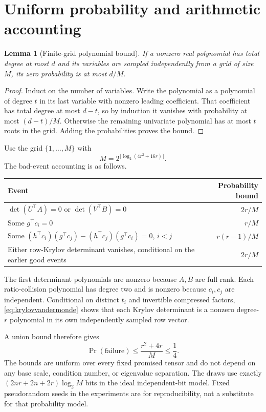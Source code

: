 \documentclass[11pt]{article}
\newtheorem{lemma}[theorem]{Lemma}
\theoremstyle{remark}\newtheorem{remark}[theorem]{Remark}
\begin{document}
\section{Uniform probability and arithmetic accounting}\label{sec:probability}
\begin{lemma}[Finite-grid polynomial bound]\label{lem:grid}
If a nonzero real polynomial has total degree at most $d$ and its variables are sampled independently from a grid of size $M$, its zero probability is at most $d/M$.
\end{lemma}
\begin{proof}
Induct on the number of variables. Write the polynomial as a polynomial of degree $t$ in its last variable with nonzero leading coefficient. That coefficient has total degree at most $d-t$, so by induction it vanishes with probability at most $(d-t)/M$. Otherwise the remaining univariate polynomial has at most $t$ roots in the grid. Adding the probabilities proves the bound.
\end{proof}

Use the grid $\{1,\ldots,M\}$ with
\begin{equation}\label{eq:gridsize}
 M=2^{\lceil\log_2(4r^2+16r)\rceil}.
\end{equation}
The bad-event accounting is as follows.
\begin{center}
\begin{tabular}{p{.65\linewidth}r}
\toprule
Event & Probability bound\\\midrule
$\det(U^\top A)=0$ or $\det(V^\top B)=0$ & $2r/M$\\
Some $g^\top c_i=0$ & $r/M$\\
Some $(h^\top c_i)(g^\top c_j)-(h^\top c_j)(g^\top c_i)=0$, $i<j$ & $r(r-1)/M$\\
Either row-Krylov determinant vanishes, conditional on the earlier good events & $2r/M$\\\bottomrule
\end{tabular}
\end{center}
The first determinant polynomials are nonzero because $A,B$ are full rank. Each ratio-collision polynomial has degree two and is nonzero because $c_i,c_j$ are independent. Conditional on distinct $t_i$ and invertible compressed factors, \eqref{eq:krylovvandermonde} shows that each Krylov determinant is a nonzero degree-$r$ polynomial in its own independently sampled row vector.

A union bound therefore gives
\begin{equation}\label{eq:success}
 \Pr(\text{failure})\le\frac{r^2+4r}{M}\le\frac14.
\end{equation}
The bounds are uniform over every fixed promised tensor and do not depend on any base scale, condition number, or eigenvalue separation. The draws use exactly
$(2nr+2n+2r)\log_2M$ bits in the ideal independent-bit model. Fixed pseudorandom seeds in the experiments are for reproducibility, not a substitute for that probability model.
\end{document}

